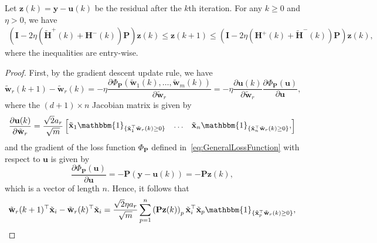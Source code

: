 \begin{lem}\label{lem.updatesignflip}
Let $\mathbf{z}(k) = \mathbf{y} - \mathbf{u}(k)$ be the residual after the $k$th iteration. For any $k \geq 0$ and $\eta > 0$, we have
\begin{multline*}
\left(\mathbf{I} - 2\eta\left(\tilde{\mathbf{H}}^+(k) + \mathbf{H}^-(k)\right)\mathbf{P}\right)\mathbf{z}(k) \leq 
    \mathbf{z}(k+1) \leq \left(\mathbf{I} - 2\eta\left({\mathbf{H}}^+(k) + \tilde{\mathbf{H}}^-(k)\right)\mathbf{P}\right)\mathbf{z}(k),
\end{multline*}
where the inequalities are entry-wise.
\end{lem}
\begin{proof}
First, by the gradient descent update rule, we have
\begin{equation*}
    \tilde{\mathbf{w}}_r(k+1) - \tilde{\mathbf{w}}_r(k) = -\eta \frac{\partial \Phi_\mathbf{P}(\tilde{\mathbf{w}}_1(k), \ldots, \tilde{\mathbf{w}}_m(k))}{\partial \tilde{\mathbf{w}}_r} = -\eta \frac{\partial \mathbf{u}(k)}{\partial \tilde{\mathbf{w}}_r} \frac{\partial \Phi_\mathbf{P}(\mathbf{u})}{\partial \mathbf{u}},
\end{equation*}
where the $(d+1)\times n$ Jacobian matrix is given by
\begin{equation}\label{eq.jacobianphi}
    \frac{\partial \mathbf{u}(k)}{\partial \tilde{\mathbf{w}}_r} = \frac{\sqrt{2}a_r}{\sqrt{m}}\begin{bmatrix}\tilde{\mathbf{x}}_1 \mathbbm{1}_{\{\tilde{\mathbf{x}}_1^\top \tilde{\mathbf{w}}_r(k) \geq 0\}} & \ldots& \tilde{\mathbf{x}}_n \mathbbm{1}_{\{\tilde{\mathbf{x}}_n^\top \tilde{\mathbf{w}}_r(k) \geq 0\}},
\end{bmatrix}
\end{equation}
and the gradient of the loss function $\Phi_\mathbf{P}$ defined in~\cref{eq:GeneralLossFunction} with respect to $\mathbf{u}$ is given by
\begin{equation}\label{eq.gradu}
    \frac{\partial \Phi_\mathbf{P}(\mathbf{u})}{\partial \mathbf{u}} = -\mathbf{P}(\mathbf{y} - \mathbf{u}(k)) = -\mathbf{P} \mathbf{z}(k),
\end{equation}
which is a vector of length $n$. Hence, it follows that
\begin{equation*}
    \tilde{\mathbf{w}}_r(k+1)^\top \tilde{\mathbf{x}}_i - \tilde{\mathbf{w}}_r(k)^\top \tilde{\mathbf{x}}_i = \frac{\sqrt{2}\eta a_r}{\sqrt{m}} \sum_{p=1}^n \left(\mathbf{P}\mathbf{z}(k)\right)_p \tilde{\mathbf{x}}_i^\top \tilde{\mathbf{x}}_p \mathbbm{1}_{\{\tilde{\mathbf{x}}_p^\top \tilde{\mathbf{w}}_r(k) \geq 0\}},

\end{equation*}
\end{proof}
